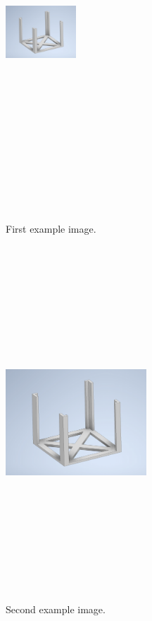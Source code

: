 \documentclass[a4paper, 12pt]{article}
\begin{document}
\begin{figure}[!h]
    \centering
    \begin{minipage}{0.45\textwidth}
        \centering
        \includegraphics[width=100px,height=500px, keepaspectratio]{img/instalace_rozvadec_konstrukce_01.png}
        \caption{First example image.}
    \end{minipage}\hfill
    \begin{minipage}{0.45\textwidth}
        \centering
        \includegraphics[width=200px,height=500px, keepaspectratio]{img/instalace_rozvadec_konstrukce_01.png}
        \caption{Second example image.}
    \end{minipage}

\end{figure}
\end{document}
